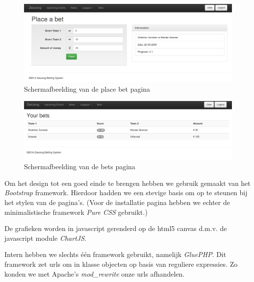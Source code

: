 \documentclass[11pt]{article}
\begin{document}
\begin{figure}[h!]
	\begin{center}
	\includegraphics[scale=0.35]{placeBet.png}

	\caption{Schermafbeelding van de place bet pagina}
	\label{fig:placeBet}
	\end{center}
\end{figure}

\begin{figure}[h!]
	\begin{center}
	\includegraphics[scale=0.35]{bets.png}
	\caption{Schermafbeelding van de bets pagina}
	\label{fig:bets}
	\end{center}
\end{figure}






Om het design tot een goed einde te brengen hebben we gebruik gemaakt van het \emph{Bootstrap} 
framework. Hierdoor hadden we een stevige basis om op te steunen bij het stylen van de pagina's. (Voor de installatie pagina hebben we echter de minimalistische framework \emph{Pure CSS} gebruikt.)

De grafieken worden in javascript gerenderd op de html5 canvas d.m.v. de javascript module \emph{ChartJS}.

Intern hebben we slechts \'e\'en framework gebruikt, namelijk \emph{GluePHP}. Dit framework zet urls om in klasse objecten op basis van reguliere expressies. Zo konden we met Apache's \emph{mod\_rewrite} onze urls afhandelen.
\end{document}
